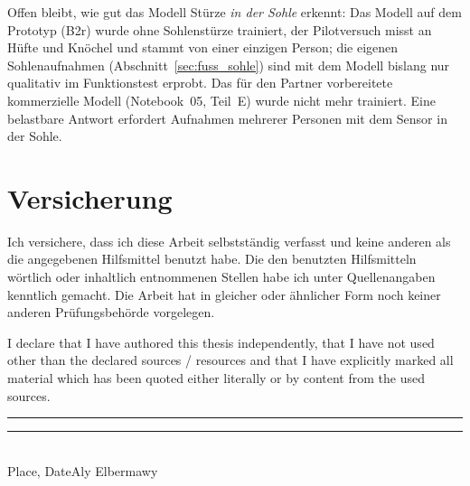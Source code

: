 \documentclass[11pt,a4paper,oneside]{report}
\begin{document}
Offen bleibt, wie gut das Modell Stürze \emph{in der Sohle} erkennt:
Das Modell auf dem Prototyp (B2r) wurde ohne Sohlenstürze trainiert,
der Pilotversuch misst an Hüfte und Knöchel und stammt von einer
einzigen Person; die eigenen Sohlenaufnahmen
(Abschnitt~\ref{sec:fuss_sohle}) sind mit dem Modell bislang nur
qualitativ im Funktionstest erprobt. Das für den Partner vorbereitete
kommerzielle Modell (Notebook~05, Teil~E) wurde nicht mehr trainiert. Eine belastbare Antwort erfordert Aufnahmen mehrerer
Personen mit dem Sensor in der Sohle.

\newpage


\newpage
\thispagestyle{empty}
\vspace*{2cm}
\section*{Versicherung}
Ich versichere, dass ich diese Arbeit selbstständig verfasst und keine anderen
als die angegebenen Hilfsmittel benutzt habe. Die den benutzten Hilfsmitteln
wörtlich oder inhaltlich entnommenen Stellen habe ich unter Quellenangaben
kenntlich gemacht. Die Arbeit hat in gleicher oder ähnlicher Form noch keiner
anderen Prüfungsbehörde vorgelegen.

\vspace{1cm}
\noindent I declare that I have authored this thesis independently, that I have
not used other than the declared sources / resources and that I have explicitly
marked all material which has been quoted either literally or by content from
the used sources.

\vspace{3cm}
\noindent
\rule{6cm}{0.4pt}\hfill\rule{6cm}{0.4pt}\\
\hspace*{1cm}Place, Date\hfill Aly Elbermawy\hspace*{2cm}
\end{document}
